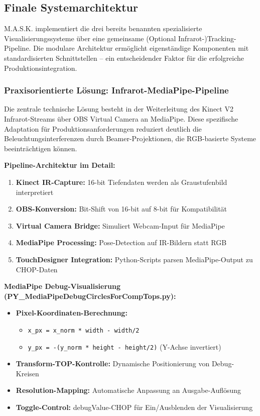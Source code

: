 
\subsection{Finale Systemarchitektur}

M.A.S.K. implementiert die drei bereits benannten spezialisierte Visualisierungssysteme über eine gemeinsame  (Optional Infrarot-)Tracking-Pipeline. Die modulare Architektur ermöglicht eigenständige Komponenten mit standardisierten Schnittstellen – ein entscheidender Faktor für die erfolgreiche Produktionsintegration.

\subsubsection{Praxisorientierte Lösung: Infrarot-MediaPipe-Pipeline}


Die zentrale technische Lösung besteht in der Weiterleitung des Kinect V2 Infrarot-Streams über OBS Virtual Camera an MediaPipe. Diese spezifische Adaptation für Produktionsanforderungen reduziert deutlich die Beleuchtungsinterferenzen durch Beamer-Projektionen, die RGB-basierte Systeme beeinträchtigen können.

\textbf{Pipeline-Architektur im Detail:}
\begin{enumerate}
    \item \textbf{Kinect IR-Capture:} 16-bit Tiefendaten werden als Graustufenbild interpretiert
    \item \textbf{OBS-Konversion:} Bit-Shift von 16-bit auf 8-bit für Kompatibilität
    \item \textbf{Virtual Camera Bridge:} Simuliert Webcam-Input für MediaPipe
    \item \textbf{MediaPipe Processing:} Pose-Detection auf IR-Bildern statt RGB
    \item \textbf{TouchDesigner Integration:} Python-Scripts parsen MediaPipe-Output zu CHOP-Daten
\end{enumerate}

\textbf{MediaPipe Debug-Visualisierung (PY\_MediaPipeDebugCirclesForCompTops.py):}
\begin{itemize}
    \item \textbf{Pixel-Koordinaten-Berechnung:} 
    \begin{itemize}
        \item \texttt{x\_px = x\_norm * width - width/2}
        \item \texttt{y\_px = -(y\_norm * height - height/2)} (Y-Achse invertiert)
    \end{itemize}
    \item \textbf{Transform-TOP-Kontrolle:} Dynamische Positionierung von Debug-Kreisen
    \item \textbf{Resolution-Mapping:} Automatische Anpassung an Ausgabe-Auflösung
    \item \textbf{Toggle-Control:} debugValue-CHOP für Ein/Ausblenden der Visualisierung
\end{itemize}

